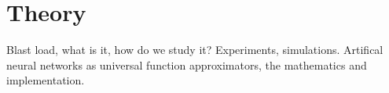 \chapter{Theory}\label{CH2}

Blast load, what is it, how do we study it?
Experiments, simulations.
Artifical neural networks as universal function approximators, the mathematics and implementation.